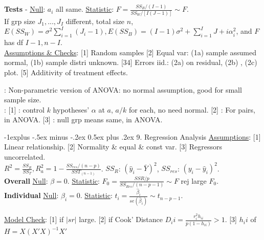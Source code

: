 \documentclass[10pt,landscape,letterpaper]{article}
\makeatletter
\renewcommand{\subsection}{\@startsection{subsection}{2}{0mm}%
                                {-1explus -.5ex minus -.2ex}%
                                {0.5ex plus .2ex}%
                                {\sffamily\normalsize\itshape}}
\renewcommand{\subsubsection}{\@startsection{subsubsection}{3}{0mm}%
                                {-1ex plus -.5ex minus -.2ex}%
                                {1ex plus .2ex}%
                                {\normalfont\small\itshape}}
\makeatother
\begin{document}
\begin{multicols}{3}
\textbf{Tests} - \underline{Null}: $a_i$ all same. \underline{Statistic}: $F = \frac{SS_B / (I-1)}{SS_W / [I(J-1)]} \sim F$.
\\
If grp size $J_1, ..., J_I$ different, total size $n$, $E(SS_W) = \sigma^2 \sum_{i=1}^I (J_i - 1), E(SS_B) = (I-1)\sigma^2 + \sum_{i=1}^I J+i \alpha_i^2$, and $F$ has df $I-1, n-I$.
\\

\underline{Assumptions \& Checks}: [1] Random samples [2] Equal var: (1a)  sample assumed normal, (1b)  sample distri unknown. [34] Errors iid.: (2a)  on residual, (2b) , (2c) plot. [5] Additivity of treatment effects.


: Non-parametric version of ANOVA: no normal assumption, good for small sample size.
\\
: [1] : control $k$ hypotheses' $\alpha$ at $a$, $a/k$ for each, no need normal. [2] : For pairs, in ANOVA. [3] : null grp means same, in ANOVA.





\subsection{9. Regression Analysis}
\underline{Assumptions}: [1] Linear relationship. [2] Normality \& equal \& const var. [3] Regressors uncorrelated.
\\
$R^2 = \frac{SS_R}{SS_T}, R^2_a = 1 - \frac{SS_{res} / (n-p)}{SST_(n-1)}$. $SS_R$: $(\hat{y}_i - \bar{Y})^2$, $SS_{res}$: $(y_i - \hat{y}_i)^2$.
\\
\textbf{Overall}
\underline{Null}: $\beta = 0$. \underline{Statistic}: $F_0 = \frac{SSR/p}{SS_{Res} / (n-p-1)} \sim F$ rej large $F_0$.
\\
\textbf{Individual}
\underline{Null}: $\beta_i = 0$. \underline{Statistic}: $t_i = \frac{\hat{\beta}_i}{se(\hat{\beta}_i)} \sim t_{n-p-1}$.


\underline{Model Check}: [1]  if $|sr|$ large. [2]  if Cook' Distance $D_ii = \frac{r_i^2 h_{ii}}{p(1-h_{ii})} > 1$. [3]  $h_ii$ of $H = X(X'X)^{-1}X'$ 



\end{multicols}
\end{document}
